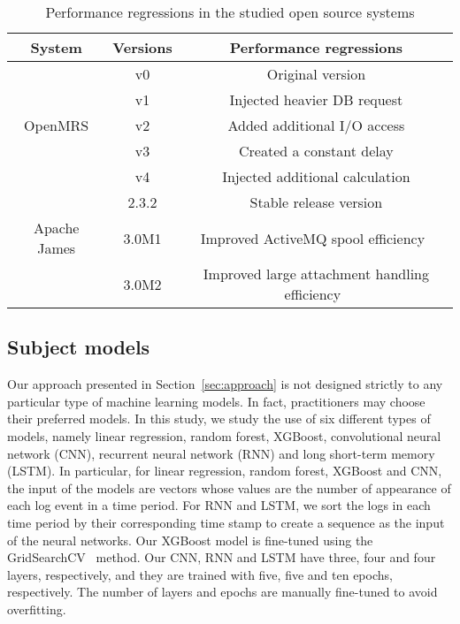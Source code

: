 \begin{table}[tbh]
  \centering
  \caption{Performance regressions in the studied open source systems}
    \begin{tabular}{c|c|p{3.3cm}}
    \hline
    System & Versions & \multicolumn{1}{c}{Performance regressions} \\
    \hline
          & v0    & \multicolumn{1}{c}{Original version} \\
\cline{2-3}          & v1    & \multicolumn{1}{c}{Injected heavier DB request} \\
\cline{2-3}    OpenMRS & v2    & \multicolumn{1}{c}{Added additional I/O access} \\
\cline{2-3}          & v3    & \multicolumn{1}{c}{Created a constant delay} \\
\cline{2-3}          & v4    & \multicolumn{1}{c}{Injected additional calculation} \\
    \hline
          & 2.3.2 & \multicolumn{1}{c}{Stable release version} \\
          \cline{2-3}
          Apache James & 3.0M1 & \multicolumn{1}{c}{Improved ActiveMQ spool efficiency~\citep{Apache-James}} \\
          \cline{2-3}
          & 3.0M2& \multicolumn{1}{c}{Improved large attachment handling efficiency~\citep{Apache-James}} \\
    \hline
    \end{tabular}%
  \label{tab:workloaddeisign}%
\end{table}%



\subsection{Subject models}
Our approach presented in Section~\ref{sec:approach} is not designed strictly to any particular type of machine learning models. In fact, practitioners may choose their preferred models. In this study, we study the use of six different types of models, namely linear regression, random forest, XGBoost, convolutional neural network (CNN), recurrent neural network (RNN) and long short-term memory (LSTM). In particular, for linear regression, random forest, XGBoost and CNN, the input of the models are vectors whose values are the number of appearance of each log event in a time period. For RNN and LSTM, we sort the logs in each time period by their corresponding time stamp to create a sequence as the input of the neural networks. Our XGBoost model is fine-tuned using the GridSearchCV~\citep{girdsearcv} method. Our CNN, RNN and LSTM have three, four and four layers, respectively, and they are trained with five, five and ten epochs, respectively. The number of layers and epochs are manually fine-tuned to avoid overfitting.
 
